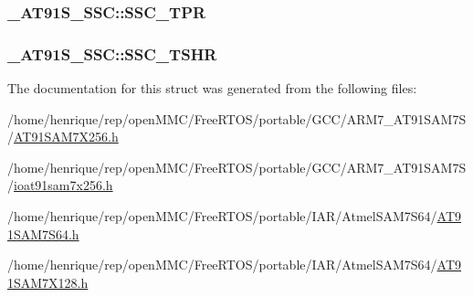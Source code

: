 \hypertarget{struct__AT91S__SSC_a66224add5cbd13520d0b5d0a38fc5c04}{
\subsubsection[{S\-S\-C\-\_\-\-T\-P\-R}]{ \-\_\-\-A\-T91\-S\-\_\-\-S\-S\-C\-::\-S\-S\-C\-\_\-\-T\-P\-R}}\label{struct__AT91S__SSC_a66224add5cbd13520d0b5d0a38fc5c04}
\hypertarget{struct__AT91S__SSC_a844c3de9ee8f891c0ce899f946951983}{
\subsubsection[{S\-S\-C\-\_\-\-T\-S\-H\-R}]{ \-\_\-\-A\-T91\-S\-\_\-\-S\-S\-C\-::\-S\-S\-C\-\_\-\-T\-S\-H\-R}}\label{struct__AT91S__SSC_a844c3de9ee8f891c0ce899f946951983}


The documentation for this struct was generated from the following files\-:\begin{DoxyCompactItemize}
\item 
/home/henrique/rep/open\-M\-M\-C/\-Free\-R\-T\-O\-S/portable/\-G\-C\-C/\-A\-R\-M7\-\_\-\-A\-T91\-S\-A\-M7\-S/\hyperlink{GCC_2ARM7__AT91SAM7S_2AT91SAM7X256_8h}{A\-T91\-S\-A\-M7\-X256.\-h}\item 
/home/henrique/rep/open\-M\-M\-C/\-Free\-R\-T\-O\-S/portable/\-G\-C\-C/\-A\-R\-M7\-\_\-\-A\-T91\-S\-A\-M7\-S/\hyperlink{ioat91sam7x256_8h}{ioat91sam7x256.\-h}\item 
/home/henrique/rep/open\-M\-M\-C/\-Free\-R\-T\-O\-S/portable/\-I\-A\-R/\-Atmel\-S\-A\-M7\-S64/\hyperlink{AT91SAM7S64_8h}{A\-T91\-S\-A\-M7\-S64.\-h}\item 
/home/henrique/rep/open\-M\-M\-C/\-Free\-R\-T\-O\-S/portable/\-I\-A\-R/\-Atmel\-S\-A\-M7\-S64/\hyperlink{AT91SAM7X128_8h}{A\-T91\-S\-A\-M7\-X128.\-h}\end{DoxyCompactItemize}
